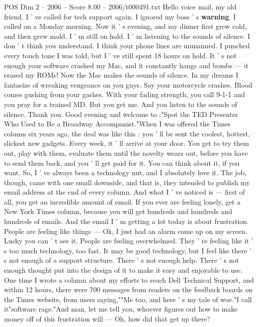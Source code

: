\begin{textsample}{POS Dim 2 – 2006 – Score 8.00 – 2006/t000491.txt}  \label{ex:f2_pos_086}
Hello voice mail, my old friend.
I ' ve called for tech support again.
I ignored my boss ' s \textbf{warning}.
I called on a Monday morning.
Now it ' s evening, and my dinner first grew cold, and then grew mold.
I ' m still on hold.
I ' m listening to the sounds of silence.
I don ' t think you understand.
I think your phone lines are unmanned.
I punched every touch tone I was told, but I ' ve still spent 18 hours on hold.
It ' s not enough your software crashed my Mac, and it constantly hangs and bombs — it erased my ROMs!
Now the Mac makes the sounds of silence.
In my dreams I fantasize of wreaking vengeance on you guys.
Say your motorcycle crashes.
Blood comes gushing from your gashes.
With your fading strength, you call 9-1-1 and you pray for a trained MD.
But you get me.
And you listen to the sounds of silence.
Thank you.
Good evening and welcome to :"Spot the TED Presenter Who Used to Be a Broadway Accompanist."When I was offered the Times column six years ago, the deal was like this : you ' ll be sent the coolest, hottest, slickest new gadgets.
Every week, it ' ll arrive at your door.
You get to try them out, play with them, evaluate them until the novelty wears out, before you have to send them back, and you ' ll get paid for it.
You can think about it, if you want.
So, I ' ve always been a technology nut, and I absolutely love it.
The job, though, came with one small downside, and that is, they intended to publish my email address at the end of every column.
And what I ' ve noticed is — first of all, you get an incredible amount of email.
If you ever are feeling lonely, get a New York Times column, because you will get hundreds and hundreds and hundreds of emails.
And the email I ' m getting a lot today is about frustration.
People are feeling like things — Ok, I just had an alarm come up on my screen.
Lucky you can ' t see it.
People are feeling overwhelmed.
They ' re feeling like it ' s too much technology, too fast.
It may be good technology, but I feel like there ' s not enough of a support structure.
There ' s not enough help.
There ' s not enough thought put into the design of it to make it easy and enjoyable to use.
One time I wrote a column about my efforts to reach Dell Technical Support, and within 12 hours, there were 700 messages from readers on the feedback boards on the Times website, from users saying,""Me too, and here ' s my tale of woe."I call it"software rage."And man, let me tell you, whoever figures out how to make money off of this frustration will — Oh, how did that get up there?

\end{textsample}

